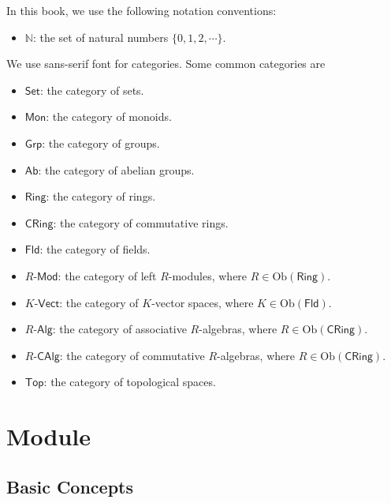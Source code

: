 \documentclass{report}
\begin{document}
In this book, we use the following notation conventions:
\begin{itemize}
    \item $\mathbb{N}$: the set of natural numbers $\{0,1,2,\cdots\}$.
\end{itemize}
We use sans-serif font for categories. Some common categories are
\begin{itemize}
    \item $\mathsf{Set}$: the category of sets.
    \item $\mathsf{Mon}$: the category of monoids.
    \item $\mathsf{Grp}$: the category of groups.
    \item $\mathsf{Ab}$: the category of abelian groups.
    \item $\mathsf{Ring}$: the category of rings.
    \item $\mathsf{CRing}$: the category of commutative rings.
    \item $\mathsf{Fld}$: the category of fields.
    \item $R\text{-}\mathsf{Mod}$: the category of left $R$-modules, where $R\in \mathrm{Ob}\left(\mathsf{Ring}\right)$.
    \item $K\text{-}\mathsf{Vect}$: the category of $K$-vector spaces, where $K\in \mathrm{Ob}\left(\mathsf{Fld}\right)$.
    \item $R\text{-}\mathsf{Alg}$: the category of associative $R$-algebras, where $R\in \mathrm{Ob}\left(\mathsf{CRing}\right)$.
    \item $R\text{-}\mathsf{CAlg}$: the category of commutative $R$-algebras, where $R\in \mathrm{Ob}\left(\mathsf{CRing}\right)$.
    \item $\mathsf{Top}$: the category of topological spaces.
\end{itemize}










\chapter{Module}
\section{Basic Concepts}
\end{document}

